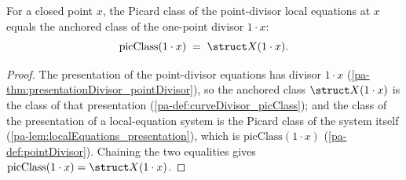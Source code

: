 \begin{theorem}
  \label{pa-thm:pointDivisor_picClass_eq}
  \leanok

  For a closed point \(x\), the Picard class of the point-divisor local equations at \(x\) equals
  the anchored class of the one-point divisor \(1 \cdot x\):
  \[
    \mathrm{picClass}(1 \cdot x) \;=\; \struct X(1 \cdot x).
  \]
\end{theorem}
\begin{proof}
  \leanok
  The presentation of the point-divisor equations has divisor \(1 \cdot x\)
  (\ref{pa-thm:presentationDivisor_pointDivisor}), so the anchored class \(\struct X(1 \cdot x)\) is
  the class of that presentation (\ref{pa-def:curveDivisor_picClass}); and the class of the
  presentation of a local-equation system is the Picard class of the system itself
  (\ref{pa-lem:localEquations_presentation}), which is \(\mathrm{picClass}(1 \cdot x)\)
  (\ref{pa-def:pointDivisor}). Chaining the two equalities gives \(\mathrm{picClass}(1 \cdot x) =
  \struct X(1 \cdot x)\).
\end{proof}

